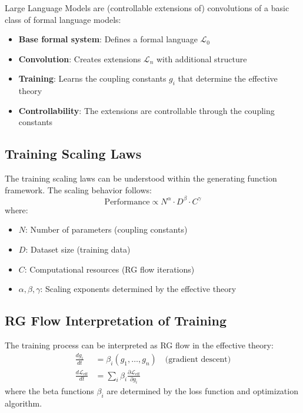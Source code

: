 \begin{theorem}
\label{thm:llm-formal}
Large Language Models are (controllable extensions of) convolutions of a basic class of formal language models:
\begin{itemize}
\item \textbf{Base formal system}: Defines a formal language $\mathcal{L}_0$
\item \textbf{Convolution}: Creates extensions $\mathcal{L}_n$ with additional structure
\item \textbf{Training}: Learns the coupling constants $g_i$ that determine the effective theory
\item \textbf{Controllability}: The extensions are controllable through the coupling constants
\end{itemize}
\end{theorem}

\subsection{Training Scaling Laws}

\begin{definition}
\label{def:scaling-laws}
The training scaling laws can be understood within the generating function framework. The scaling behavior follows:
\[
\text{Performance} \propto N^{\alpha} \cdot D^{\beta} \cdot C^{\gamma}
\]
where:
\begin{itemize}
\item $N$: Number of parameters (coupling constants)
\item $D$: Dataset size (training data)
\item $C$: Computational resources (RG flow iterations)
\item $\alpha, \beta, \gamma$: Scaling exponents determined by the effective theory
\end{itemize}
\end{definition}

\subsection{RG Flow Interpretation of Training}

\begin{theorem}
\label{thm:training-rg}
The training process can be interpreted as RG flow in the effective theory:
\begin{align}
\frac{dg_i}{dt} &= \beta_i(g_1, \ldots, g_n) \quad \text{(gradient descent)} \\
\frac{d\mathcal{L}_{\text{eff}}}{dt} &= \sum_i \beta_i \frac{\partial \mathcal{L}_{\text{eff}}}{\partial g_i}
\end{align}
where the beta functions $\beta_i$ are determined by the loss function and optimization algorithm.
\end{theorem}

